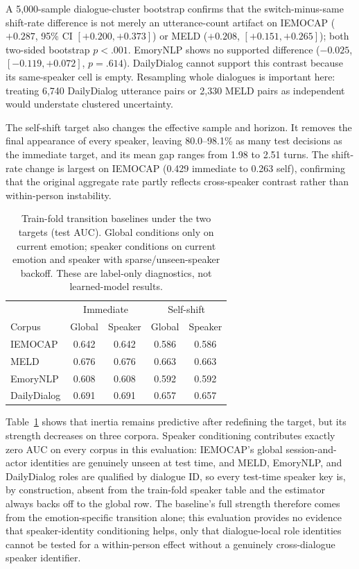 \documentclass{ieeeaccess}
\begin{document}
A 5{,}000-sample dialogue-cluster bootstrap confirms that the switch-minus-same shift-rate
difference is not merely an utterance-count artifact on IEMOCAP ($+0.287$, 95\% CI
$[+0.200,+0.373]$) or MELD ($+0.208$, $[+0.151,+0.265]$); both two-sided bootstrap
$p<.001$. EmoryNLP shows no supported difference ($-0.025$, $[-0.119,+0.072]$, $p=.614$).
DailyDialog cannot support this contrast because its same-speaker cell is empty. Resampling whole
dialogues is important here: treating 6{,}740 DailyDialog utterance pairs or 2{,}330 MELD pairs as
independent would understate clustered uncertainty.

The self-shift target also changes the effective sample and horizon. It removes the final
appearance of every speaker, leaving 80.0--98.1\% as many test decisions as the immediate target,
and its mean gap ranges from 1.98 to 2.51 turns. The shift-rate change is largest on IEMOCAP
(0.429 immediate to 0.263 self), confirming that the original aggregate rate partly reflects
cross-speaker contrast rather than within-person instability.

\begin{table}[t]
\centering
\footnotesize
\caption{Train-fold transition baselines under the two targets (test AUC). Global conditions only
on current emotion; speaker conditions on current emotion and speaker with sparse/unseen-speaker
backoff. These are label-only diagnostics, not learned-model results.}
\label{tab:selfbase}
\begin{tabular}{lcccc}
\toprule
& \multicolumn{2}{c}{Immediate} & \multicolumn{2}{c}{Self-shift} \\
Corpus & Global & Speaker & Global & Speaker \\
\midrule
IEMOCAP     & 0.642 & 0.642 & 0.586 & 0.586 \\
MELD        & 0.676 & 0.676 & 0.663 & 0.663 \\
EmoryNLP    & 0.608 & 0.608 & 0.592 & 0.592 \\
DailyDialog & 0.691 & 0.691 & 0.657 & 0.657 \\
\bottomrule
\end{tabular}
\end{table}

Table~\ref{tab:selfbase} shows that inertia remains predictive after redefining the target, but its
strength decreases on three corpora. Speaker conditioning contributes exactly zero AUC on every
corpus in this evaluation: IEMOCAP's global session-and-actor identities are genuinely unseen at
test time, and MELD, EmoryNLP, and DailyDialog roles are qualified by dialogue ID, so every
test-time speaker key is, by construction, absent from the train-fold speaker table and
the estimator always backs off to the global row. The baseline's full strength therefore comes
from the emotion-specific transition alone; this evaluation provides no evidence that
speaker-identity conditioning helps, only that dialogue-local role identities cannot be tested
for a within-person effect without a genuinely cross-dialogue speaker identifier.
\end{document}
